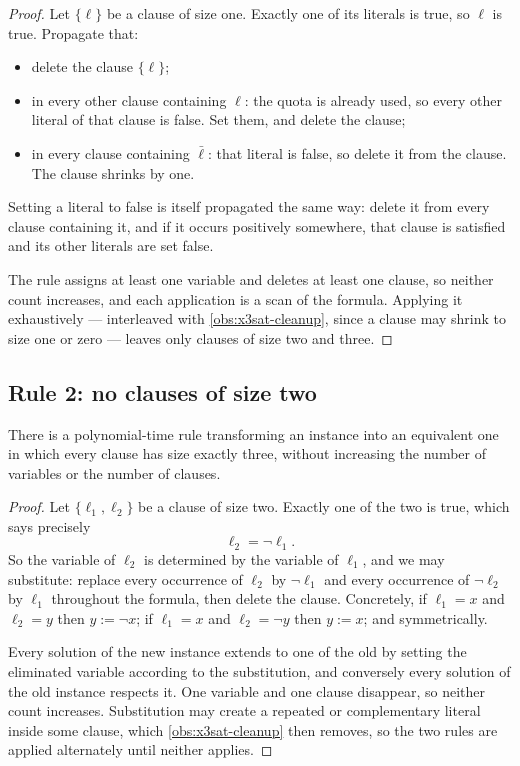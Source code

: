 \begin{proof}
Let $\{\ell\}$ be a clause of size one. Exactly one of its literals is true, so
$\ell$ is true. Propagate that:
\begin{itemize}[leftmargin=*,nosep]
  \item delete the clause $\{\ell\}$;
  \item in every other clause containing $\ell$: the quota is already used, so
        every other literal of that clause is false. Set them, and delete the
        clause;
  \item in every clause containing $\bar\ell$: that literal is false, so delete
        it from the clause. The clause shrinks by one.
\end{itemize}
Setting a literal to false is itself propagated the same way: delete it from
every clause containing it, and if it occurs positively somewhere, that clause
is satisfied and its other literals are set false.

The rule assigns at least one variable and deletes at least one clause, so
neither count increases, and each application is a scan of the formula. Applying
it exhaustively --- interleaved with \cref{obs:x3sat-cleanup}, since a clause
may shrink to size one or zero --- leaves only clauses of size two and three.
\end{proof}

\subsection{Rule 2: no clauses of size two}

\begin{lemma}\label{lem:x3sat-rule2}
There is a polynomial-time rule transforming an instance into an equivalent one
in which every clause has size exactly three, without increasing the number of
variables or the number of clauses.
\end{lemma}

\begin{proof}
Let $\{\ell_1, \ell_2\}$ be a clause of size two. Exactly one of the two is
true, which says precisely
\[ \ell_2 = \neg \ell_1 . \]
So the variable of $\ell_2$ is determined by the variable of $\ell_1$, and we
may substitute: replace every occurrence of $\ell_2$ by $\neg\ell_1$ and every
occurrence of $\neg\ell_2$ by $\ell_1$ throughout the formula, then delete the
clause. Concretely, if $\ell_1 = x$ and $\ell_2 = y$ then $y := \neg x$; if
$\ell_1 = x$ and $\ell_2 = \neg y$ then $y := x$; and symmetrically.

Every solution of the new instance extends to one of the old by setting the
eliminated variable according to the substitution, and conversely every solution
of the old instance respects it. One variable and one clause disappear, so
neither count increases. Substitution may create a repeated or complementary
literal inside some clause, which \cref{obs:x3sat-cleanup} then removes, so the
two rules are applied alternately until neither applies.
\end{proof}

